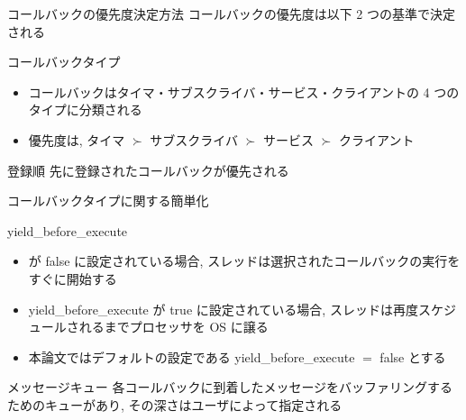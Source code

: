 \begin{frame}{コールバックの優先度決定方法}
    コールバックの優先度は以下 2 つの基準で決定される

    \begin{block}{コールバックタイプ}
        \setlength{\linewidth}{0.98\columnwidth}
        \begin{itemize}
            \item コールバックはタイマ・サブスクライバ・サービス・クライアントの 4 つのタイプに分類される
            \item 優先度は, タイマ $\succ$ サブスクライバ $\succ$ サービス $\succ$ クライアント 
        \end{itemize}
    \end{block}

    \begin{block}{登録順}
        先に登録されたコールバックが優先される
    \end{block}
\end{frame}

\begin{frame}{コールバックタイプに関する簡単化}
\end{frame}

\begin{frame}{yield\_before\_execute}
    \begin{itemize}
        \item {} が false に設定されている場合, スレッドは選択されたコールバックの実行をすぐに開始する
        \item yield\_before\_execute が true に設定されている場合, スレッドは再度スケジュールされるまでプロセッサを OS に譲る
        \item 本論文ではデフォルトの設定である yield\_before\_execute $=$ false とする
    \end{itemize}
\end{frame}

\begin{frame}{メッセージキュー}
    各コールバックに到着したメッセージをバッファリングするためのキューがあり, その深さはユーザによって指定される
\end{frame}

